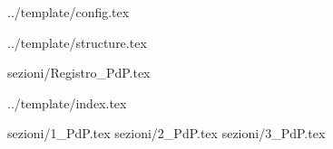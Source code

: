  {../template/config.tex}


\def\DOCUMENTO{Piano di Progetto}
\def\VERSIONE{0.0.1}

\def\DESCRIZIONE{<Info documento>}

\def\REDATTORE {<Redattore>}
\def\VERIFICATORE {<Verificatore>}
\def\RESPONSABILE {<Responsabile>}

\def\USO {<Uso>}

\def\DISTRIBUZIONE {\GRUPPO{}\\ & \COMMITTENTE{}\\}

\def\DESCRIZIONE {<descrizione>}


\def\INDICE	{true}
\def\TABELLE {true}
\def\FIGURE {false}


 {../template/structure.tex}

 {sezioni/Registro_PdP.tex}

 {../template/index.tex}


 {sezioni/1_PdP.tex}
 {sezioni/2_PdP.tex}
 {sezioni/3_PdP.tex}





